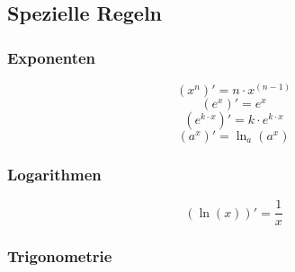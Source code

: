 
\newpage

\subsection{Spezielle Regeln}

\subsubsection{Exponenten}
\[ \boxed{ (x^n)' = n\cdot x^{(n-1)} } \]
\[ \boxed{ (e^x)' = e^x } \]
\[ \boxed{ (e^{k\cdot x})' = k \cdot e^{k\cdot x} } \]
\[ \boxed{ (a^x)' = \ln_a (a^x) } \]

\subsubsection{Logarithmen}
\[ \boxed{ (\ln(x))' = \frac{1}{x} } \]  

\subsubsection{Trigonometrie}

